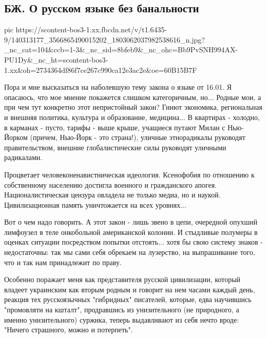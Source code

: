  
 
 
 
 

\subsection{БЖ. О русском языке без банальности}

\ifcmt
  pic https://scontent-bos3-1.xx.fbcdn.net/v/t1.6435-9/140313177_3566865490015202_1803062037982538616_n.jpg?_nc_cat=104&ccb=1-3&_nc_sid=8bfeb9&_nc_ohc=Bb9PvSNH994AX-PU1Dy&_nc_ht=scontent-bos3-1.xx&oh=2734364df86f7ce267c990ca12e3ac2e&oe=60B15B7F
\fi

Пора и мне высказаться на наболевшую тему закона о языке от 16.01. Я опасаюсь,
что мое мнение покажется слишком категоричным, но... Родные мои, а при чем тут
конкретно этот непристойный закон? Гниют экономика, региональная и внешняя
политика, культура и образование, медицина... В квартирах - холодно, в карманах
- пусто, тарифы - выше крыше, учащиеся путают Милан с Нью-Йорком (причем,
Нью-Йорк - это страна!), уличные этнорадикалы руководят правительством, внешние
глобалистические силы руководят уличными радикалами.  

Процветает человеконенавистническая идеология. Ксенофобия по отношению к
собственному населению достигла военного и гражданского апогея.
Националистическая цензура овладела не только медиа, но и наукой.
Цивилизационная память уничтожается на всех уровнях...

Вот о чем надо говорить. А этот закон - лишь звено в цепи, очередной опухший
лимфоузел в теле онкобольной американской колонии. И стыдливые полумеры в
оценках ситуации посредством попытки отстоять... хотя бы свою систему знаков -
недостаточны: так мы сами себя обрекаем на лузерство, на выпрашивание того, что
и так нам принадлежит по праву.

Особенно поражает меня как представителя русской цивилизации, который владеет
украинским как вторым родным и говорит на нем часами каждый день, реакция тех
русскоязычных "гибридных" писателей, которые, едва научившись "промовляти на
кшталт",  продравшись из унизительного (не природного, а именно унизительного)
суржика, теперь выдавливают из себя нечто вроде: "Ничего страшного, можно и
потерпеть". 

